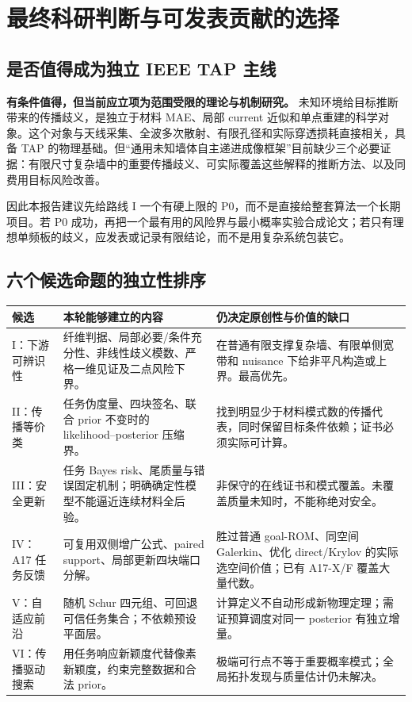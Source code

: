 \section{最终科研判断与可发表贡献的选择}
\subsection{是否值得成为独立 IEEE TAP 主线}
\textbf{有条件值得，但当前应立项为范围受限的理论与机制研究。} 未知环境给目标推断带来的传播歧义，是独立于材料 MAE、局部 current 近似和单点重建的科学对象。这个对象与天线采集、全波多次散射、有限孔径和实际穿透损耗直接相关，具备 TAP 的物理基础。但“通用未知墙体自主递进成像框架”目前缺少三个必要证据：有限尺寸复杂墙中的重要传播歧义、可实际覆盖这些解释的推断方法、以及同费用目标风险改善。

因此本报告建议先给路线 I 一个有硬上限的 P0，而不是直接给整套算法一个长期项目。若 P0 成功，再把一个最有用的风险界与最小概率实验合成论文；若只有理想单频板的歧义，应发表或记录有限结论，而不是用复杂系统包装它。

\subsection{六个候选命题的独立性排序}
\begin{longtable}{p{23mm}p{64mm}p{61mm}}
\toprule
候选 & 本轮能够建立的内容 & 仍决定原创性与价值的缺口\\
\midrule
I：下游可辨识性 & 纤维判据、局部必要/条件充分性、非线性歧义模数、严格一维见证及二点风险下界。 & 在普通有限支撑复杂墙、有限单侧宽带和 nuisance 下给非平凡构造或上界。最高优先。\\
II：传播等价类 & 任务伪度量、四块签名、联合 prior 不变时的 likelihood--posterior 压缩界。 & 找到明显少于材料模式数的传播代表，同时保留目标条件依赖；证书必须实际可计算。\\
III：安全更新 & 任务 Bayes risk、尾质量与错误固定机制；明确确定性模型不能逼近连续材料全后验。 & 非保守的在线证书和模式覆盖。未覆盖质量未知时，不能称绝对安全。\\
IV：A17 任务反馈 & 可复用双侧增广公式、paired support、局部更新四块端口分解。 & 胜过普通 goal-ROM、同空间 Galerkin、优化 direct/Krylov 的实际选空间价值；已有 A17-X/F 覆盖大量代数。\\
V：自适应前沿 & 随机 Schur 四元组、可回退可信任务集合；不依赖预设平面层。 & 计算定义不自动形成新物理定理；需证预算调度对同一 posterior 有独立增量。\\
VI：传播驱动搜索 & 用任务响应新颖度代替像素新颖度，约束完整数据和合法 prior。 & 极端可行点不等于重要概率模式；全局拓扑发现与质量估计仍未解决。\\
\bottomrule
\end{longtable}

